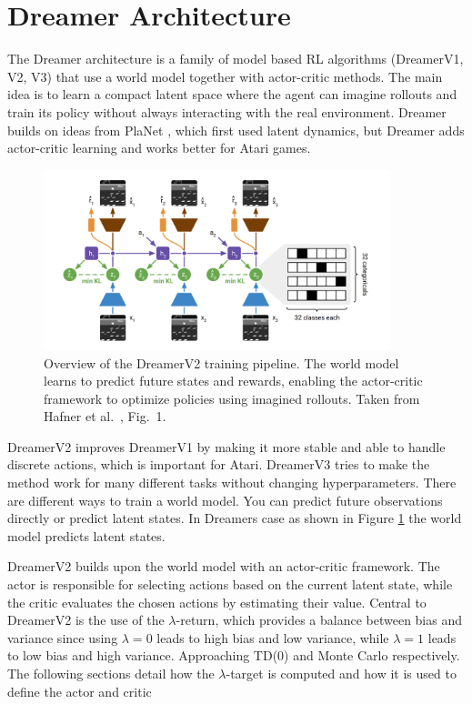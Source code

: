 \documentclass[
	english,
	ruledheaders=section,
	class=report,
	thesis={type=master},
	accentcolor=9c,
	custommargins=true,
	marginpar=false,
	parskip=half-,
	fontsize=11pt,
]{tudapub}
\begin{document}
\section{Dreamer Architecture}
\label{sec:dreamer_architecture}

The Dreamer architecture is a family of model based RL algorithms (DreamerV1,
V2, V3) that use a world model together with actor-critic methods. The main
idea is to learn a compact latent space where the agent can imagine rollouts
and train its policy without always interacting with the real environment.
Dreamer builds on ideas from PlaNet \cite{hafner2019learninglatentdynamicsplanning}, which first used latent dynamics, but
Dreamer adds actor-critic learning and works better for Atari games.

\begin{figure}[ht]
	\centering
	\includegraphics[width=0.9\textwidth]{images/DreamerFlow.png}
	\caption{Overview of the DreamerV2 training pipeline. The world model learns to predict future states and rewards, enabling the actor-critic framework to optimize policies using imagined rollouts. Taken from Hafner et al.~\cite{hafner2021mastering}, Fig.~1.}
	\label{fig:dreamer_flow}
\end{figure}

DreamerV2 improves DreamerV1 by making it more stable and able to handle
discrete actions, which is important for Atari. DreamerV3 tries to make the
method work for many different tasks without changing hyperparameters. There
are different ways to train a world model. You can predict future observations
directly or predict latent states. In Dreamers case as shown in Figure
\ref{fig:dreamer_flow} the world model predicts latent states.

DreamerV2 builds upon the world model with an actor-critic framework. The actor
is responsible for selecting actions based on the current latent state, while
the critic evaluates the chosen actions by estimating their value. Central to DreamerV2 is the
use of the $\lambda$-return, which provides a balance between bias and variance
since using $\lambda=0$ leads to high bias and low variance, while $\lambda=1$ leads to low bias and high variance. Approaching
TD(0) and Monte Carlo respectively. The following sections detail how the
$\lambda$-target is computed and how it is used to define the actor and critic
\end{document}
